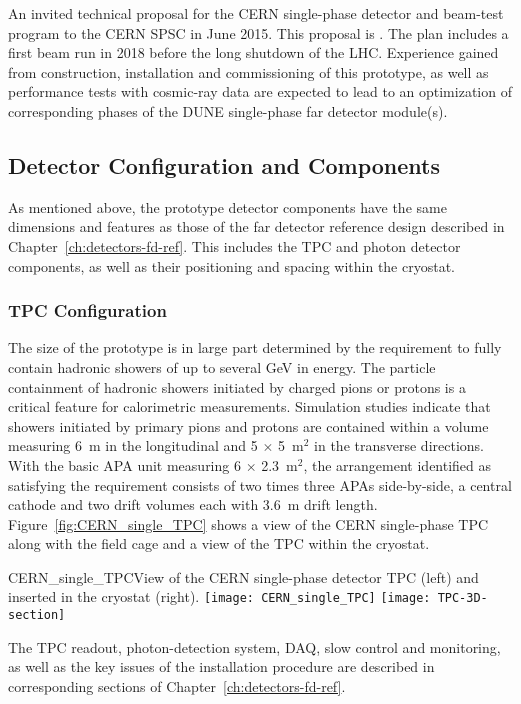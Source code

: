 An invited technical proposal for the CERN single-phase detector and
beam-test program
to the CERN SPSC in June 2015. This proposal is \anxcernproto. The plan includes a first beam run in
2018 before the long shutdown of the LHC. Experience gained from
construction, installation and commissioning of this prototype, as
well as performance tests with cosmic-ray data are expected to lead to
an optimization of corresponding phases of the DUNE single-phase far
detector module(s).

\subsection{Detector Configuration and Components}

As mentioned above, the prototype detector components have 
the same dimensions and features as those of the far detector reference design described in
Chapter~\ref{ch:detectors-fd-ref}. This includes the TPC and photon
detector components, as well as their positioning and spacing within
the cryostat.


\subsubsection{TPC Configuration}

The size of the prototype is in large part determined by the
requirement to fully contain hadronic showers of up to several GeV in
energy.  The particle containment of hadronic showers initiated by
charged pions or protons is a critical feature for calorimetric
measurements. Simulation studies indicate that showers initiated by
 primary pions and protons are contained within a volume
measuring 6~m in the longitudinal and 5 $\times$ 5~m$^2$ in the
transverse directions. With the basic APA unit measuring
6 $\times$ 2.3~m$^2$, the arrangement identified as satisfying the
requirement consists of two times three APAs side-by-side, a central
cathode and two drift volumes each with 3.6~m drift
length. Figure~\ref{fig:CERN_single_TPC} shows a view of the CERN
single-phase TPC along with the field cage and a view of the TPC
within the cryostat.
\begin{cdrfigure}{CERN_single_TPC}{View of the CERN single-phase detector TPC (left) and inserted in the cryostat (right). }
\texttt{[image: CERN\_single\_TPC]}
\texttt{[image: TPC-3D-section]}
\end{cdrfigure}
The TPC readout, photon-detection system, DAQ, slow control and
monitoring, as well as the key issues of the installation procedure
are described in corresponding sections of
Chapter~\ref{ch:detectors-fd-ref}.

